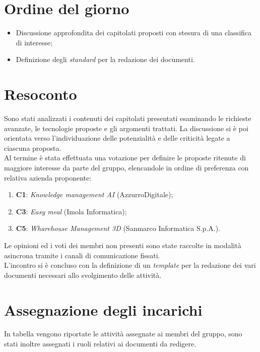 \section{Ordine del giorno}
\begin{itemize}
    \item Discussione approfondita dei capitolati proposti con stesura di una classifica di interesse;
    \item Definizione degli \textit{standard} per la redazione dei documenti.
\end{itemize}

\section{Resoconto}
Sono stati analizzati i contenuti dei capitolati presentati esaminando le richieste avanzate, le tecnologie proposte e gli argomenti trattati.
La discussione si è poi orientata verso l'individuazione delle potenzialità e delle criticità legate a ciascuna proposta. \\
\noindent
Al termine è stata effettuata una votazione per definire le proposte ritenute di maggiore interesse da parte del gruppo, elencandole in ordine di preferenza con relativa azienda proponente:
\begin{enumerate}
    \item \textbf{C1}: \textit{Knowledge management AI} (AzzurroDigitale);
    \item \textbf{C3}: \textit{Easy meal} (Imola Informatica);
    \item \textbf{C5}: \textit{Wharehouse Management 3D} (Sanmarco Informatica S.p.A.).
\end{enumerate}
Le opinioni ed i voti dei membri non presenti sono state raccolte in modalità asincrona tramite i canali di comunicazione fissati.\\
\noindent
L'incontro si è concluso con la definizione di un \textit{template} per la redazione dei vari documenti necessari allo svolgimento delle attività.

\section{Assegnazione degli incarichi}
In tabella vengono riportate le attività assegnate ai membri del gruppo, sono stati inoltre assegnati i ruoli relativi ai documenti da redigere.

